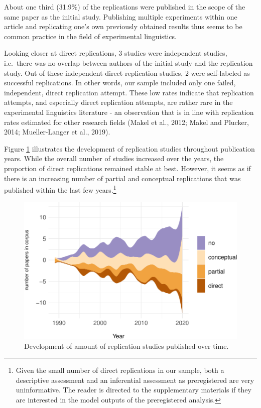 \documentclass[]{elsarticle} %
\begin{document}
About one third (31.9\%) of the replications were published in the scope of the same paper as the initial study. Publishing multiple experiments within one article and replicating one's own previously obtained results thus seems to be common practice in the field of experimental linguistics.

Looking closer at direct replications, 3 studies were independent studies, i.e.~there was no overlap between authors of the initial study and the replication study.
Out of these independent direct replication studies, 2 were self-labeled as successful replications.
In other words, our sample included only one failed, independent, direct replication attempt. These low rates indicate that replication attempts, and especially direct replication attempts, are rather rare in the experimental linguistics literature - an observation that is in line with replication rates estimated for other research fields (Makel et al., 2012; Makel and Plucker, 2014; Mueller-Langer et al., 2019).

Figure \ref{fig:stream-plot} illustrates the development of replication studies throughout publication years.
While the overall number of studies increased over the years, the proportion of direct replications remained stable at best.
However, it seems as if there is an increasing number of partial and conceptual replications that was published within the last few years.\footnote{Given the small number of direct replications in our sample, both a descriptive assessment and an inferential assessment as preregistered are very uninformative. The reader is directed to the supplementary materials if they are interested in the model outputs of the preregistered analysis.}

\begin{figure}

{\centering \includegraphics[width=1\linewidth]{ReplicationLing_files/figure-latex/stream-plot-1} 

}

\caption{Development of amount of replication studies published over time.}\label{fig:stream-plot}
\end{figure}
\end{document}
